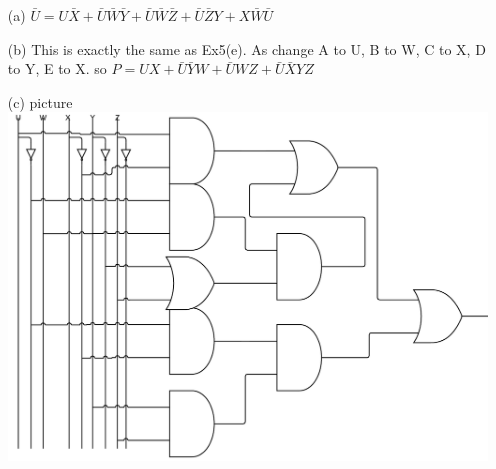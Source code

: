 \documentclass[10pt,twoside,a4paper]{article}
\begin{document}
\begin{enumerate}
\item[(a)]
$\bar{U}=U\bar{X}+\bar{U}\bar{W}\bar{Y}+\bar{U}\bar{W}\bar{Z}+\bar{U}\bar{Z}Y+X\bar{W}\bar{U}$
\item[(b)]
This is exactly the same as Ex5(e).\newline
As change A to U, B to W, C to X, D to Y, E to X.\newline
so $P=UX+\bar{U}\bar{Y}W+\bar{U}WZ+\bar{U}\bar{X}YZ$

\item[(c)]
picture \newline
\includegraphics[scale=0.8]{8.png} 

\end{enumerate}




%
\end{document}
